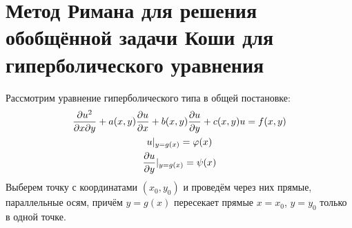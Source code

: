 \documentclass[../main.tex]{subfiles}
\begin{document}
\section{Метод Римана для решения обобщённой задачи Коши для гиперболического уравнения}

Рассмотрим уравнение гиперболического типа в общей постановке:
\begin{gather}
    \label{eq:2.7.1}
    \pderivtwo{u}{x}{y} + a(x,y)\pderiv{u}{x} +b(x,y)\pderiv{u}{y} + c(x,y)u = f(x,y)\\
    \label{eq:2.7.2}
    u|_{y=g(x)} = \varphi(x)\\
    \pderiv{u}{y}|_{y=g(x)} = \psi(x)
\end{gather}
Выберем точку с координатами $(x_0,y_0)$ и проведём через них прямые,
параллельные осям, причём $y=g(x)$ пересекает прямые $x=x_0$, $y=y_0$ только в одной точке.
\end{document}

